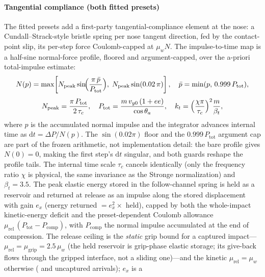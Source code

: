 \paragraph{Tangential compliance (both fitted presets)} The fitted
presets add a first-party tangential-compliance element at the nose: a
Cundall--Strack-style bristle spring per nose tangent direction, fed
by the contact-point slip, its per-step force Coulomb-capped at
$\mu_w N$. The impulse-to-time map is a half-sine normal-force
profile, floored and argument-capped, over the a-priori total-impulse
estimate:
\begin{equation}
N(p) = \max\!\left[
N_{\mathrm{peak}}\sin\!\Bigl(\frac{\pi\,\bar{p}}{P_{\mathrm{tot}}}\Bigr),\;
N_{\mathrm{peak}}\sin(0.02\,\pi)\right],
\quad
\bar{p} = \min(p,\, 0.999\,P_{\mathrm{tot}}),
\label{eq:bristle}
\end{equation}
\begin{equation}
N_{\mathrm{peak}} = \frac{\pi\,P_{\mathrm{tot}}}{2\,\tau_c},
\quad
P_{\mathrm{tot}} = \frac{m\,v_{y0}\,(1 + ee)}{\cos\theta_a},
\quad
k_t = \Bigl(\frac{\chi\pi}{\tau_c}\Bigr)^{2}\frac{m}{\beta_t},
\label{eq:bristle-kt}
\end{equation}
where $p$ is the accumulated normal impulse and the integrator
advances internal time as $\mathrm{d}t = \Delta P / N(p)$. The
$\sin(0.02\pi)$ floor and the $0.999\,P_{\mathrm{tot}}$ argument cap
are part of the frozen arithmetic, not implementation detail: the bare
profile gives $N(0) = 0$, making the first step's $\mathrm{d}t$
singular, and both guards reshape the profile tails. The internal time
scale $\tau_c$ cancels identically (only the frequency ratio $\chi$ is
physical, the same invariance as the Stronge normalization) and
$\beta_t = 3.5$. The peak elastic energy stored in
the follow-channel spring is held as a reservoir and returned at
release as an impulse along the stored displacement with gain $e_x$
(energy returned $= e_x^{2} \times$ held), capped by both the
whole-impact kinetic-energy deficit and the preset-dependent Coulomb
allowance $\mu_{\mathrm{rel}}\,(P_{\mathrm{tot}} -
P_{\mathrm{comp}})$, with $P_{\mathrm{comp}}$ the normal impulse
accumulated at the end of compression. The release ceiling is the
\emph{static} grip bound for a captured 
impact---$\mu_{\mathrm{rel}} = \mu_{\mathrm{grip}} = 2.5\,\mu_w$ (the
held reservoir is grip-phase elastic storage; its give-back flows
through the gripped interface, not a sliding one)---and the kinetic
$\mu_{\mathrm{rel}} = \mu_w$ otherwise ( and
uncaptured arrivals); $e_x$ is a
